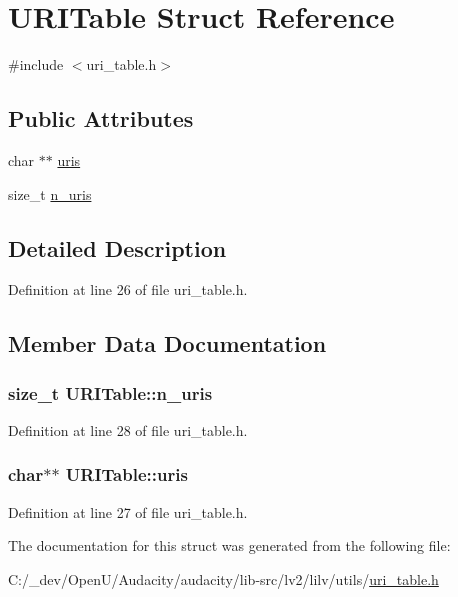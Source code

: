 \hypertarget{struct_u_r_i_table}{}\section{U\+R\+I\+Table Struct Reference}
\label{struct_u_r_i_table}


{\ttfamily \#include $<$uri\+\_\+table.\+h$>$}

\subsection*{Public Attributes}
\begin{DoxyCompactItemize}
\item 
char $\ast$$\ast$ \hyperlink{struct_u_r_i_table_a90b2da46c294487b35b74927f70ff459}{uris}
\item 
size\+\_\+t \hyperlink{struct_u_r_i_table_a72f1e9b1607483e8bba62bc81b1b49ce}{n\+\_\+uris}
\end{DoxyCompactItemize}


\subsection{Detailed Description}


Definition at line 26 of file uri\+\_\+table.\+h.



\subsection{Member Data Documentation}
\subsubsection[{\texorpdfstring{n\+\_\+uris}{n_uris}}]{\setlength{\rightskip}{0pt plus 5cm}size\+\_\+t U\+R\+I\+Table\+::n\+\_\+uris}\hypertarget{struct_u_r_i_table_a72f1e9b1607483e8bba62bc81b1b49ce}{}\label{struct_u_r_i_table_a72f1e9b1607483e8bba62bc81b1b49ce}


Definition at line 28 of file uri\+\_\+table.\+h.

\subsubsection[{\texorpdfstring{uris}{uris}}]{\setlength{\rightskip}{0pt plus 5cm}char$\ast$$\ast$ U\+R\+I\+Table\+::uris}\hypertarget{struct_u_r_i_table_a90b2da46c294487b35b74927f70ff459}{}\label{struct_u_r_i_table_a90b2da46c294487b35b74927f70ff459}


Definition at line 27 of file uri\+\_\+table.\+h.



The documentation for this struct was generated from the following file\+:\begin{DoxyCompactItemize}
\item 
C\+:/\+\_\+dev/\+Open\+U/\+Audacity/audacity/lib-\/src/lv2/lilv/utils/\hyperlink{uri__table_8h}{uri\+\_\+table.\+h}\end{DoxyCompactItemize}

